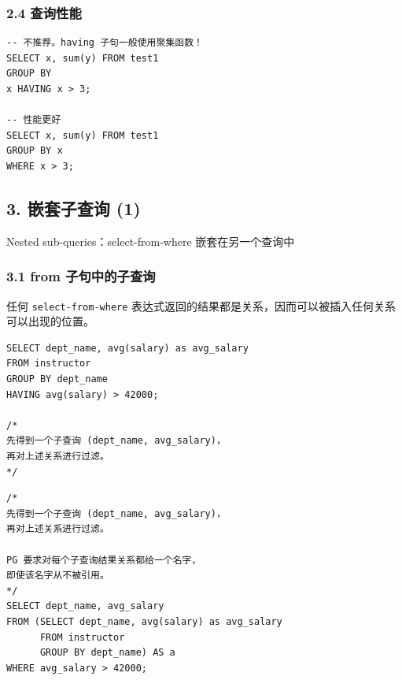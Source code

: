 \documentclass[aspectratio=169, 14pt]{beamer}
\begin{document}
\begin{frame}[fragile]
    \frametitle{2.4 查询性能}
    \begin{verbatim} 
-- 不推荐。having 子句一般使用聚集函数！
SELECT x, sum(y) FROM test1 
GROUP BY 
x HAVING x > 3;

-- 性能更好
SELECT x, sum(y) FROM test1 
GROUP BY x 
WHERE x > 3;
    \end{verbatim}

    

\end{frame}

\begin{frame}[fragile]
    \section{\textcolor{darkmidnightblue}{3. 嵌套子查询 (1)}}  
    Nested sub-queries：\alert{select-from-where} 嵌套在另一个查询中

\end{frame}

\begin{frame}[fragile]
    \frametitle{3.1 from 子句中的子查询}
    任何 \texttt{select-from-where} 表达式返回的结果都是关系，因而可以被插入任何关系可以出现的位置。

    \begin{verbatim}
SELECT dept_name, avg(salary) as avg_salary
FROM instructor
GROUP BY dept_name
HAVING avg(salary) > 42000;

/*
先得到一个子查询 (dept_name, avg_salary)，
再对上述关系进行过滤。
*/
    \end{verbatim} 
    
\end{frame}

\begin{frame}[fragile]

    \begin{verbatim}
/*
先得到一个子查询 (dept_name, avg_salary)，
再对上述关系进行过滤。

PG 要求对每个子查询结果关系都给一个名字，
即使该名字从不被引用。
*/
SELECT dept_name, avg_salary
FROM (SELECT dept_name, avg(salary) as avg_salary
      FROM instructor
      GROUP BY dept_name) AS a
WHERE avg_salary > 42000;
    \end{verbatim} 

\end{frame}
\end{document}
